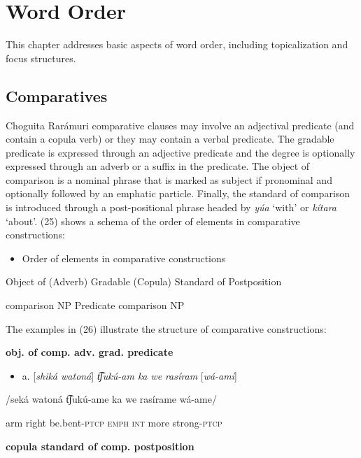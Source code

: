 \chapter{Word Order}
\label{chap: word order}

This chapter addresses basic aspects of word order, including topicalization and focus structures. 

\section{Comparatives}
\label{sec:20:comparative constructions}

Choguita Rarámuri comparative clauses may involve an adjectival predicate (and contain a copula verb) or they may contain a verbal predicate. The gradable predicate is expressed through an adjective predicate and the degree is optionally expressed through an adverb or a suffix in the predicate. The object of comparison is a nominal phrase that is marked as subject if pronominal and optionally followed by an emphatic particle. Finally, the standard of comparison is introduced through a post-positional phrase headed by \textit{yúa} ‘with’ or \textit{kítara} ‘about’. (25) shows a schema of the order of elements in comparative constructions:

\begin{itemize}
\item Order of elements in comparative constructions
\end{itemize}

  Object of     (Adverb)  Gradable  (Copula)  Standard of   Postposition  

  comparison NP       Predicate      comparison NP

  The examples in (26) illustrate the structure of comparative constructions: 

 \textbf{obj. of comp.              adv.    grad. predicate} 

\begin{itemize}
\item a.   [\textit{shiká  watoná}] \textit{t͡ʃukú-am     ka  we}  \textit{rasíram} [\textit{wá-ami}]   
\end{itemize}

/seká  watoná  t͡ʃukú-ame    ka  we  rasírame  wá-ame/  

arm  right    be.bent-\textsc{ptcp  emph  int} more strong-\textsc{ptcp} 

 \textbf{copula  standard of comp.  postposition}  

